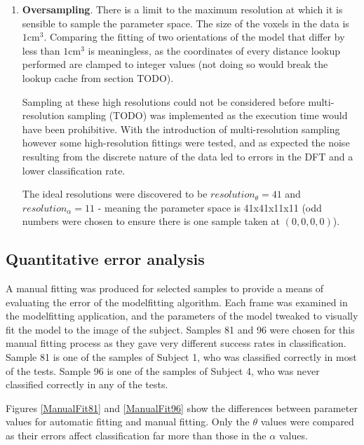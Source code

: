 \begin{enumerate}
	\item \textbf{Oversampling}.
		There is a limit to the maximum resolution at which it is sensible to sample the parameter space.
		The size of the voxels in the data is $1\text{cm}^3$.
		Comparing the fitting of two orientations of the model that differ by less than $1\text{cm}^3$ is meaningless,
		as the coordinates of every distance lookup performed are clamped to integer values (not doing so would break
		the lookup cache from section TODO).
		
		Sampling at these high resolutions could not be considered before multi-resolution sampling (TODO) was implemented
		as the execution time would have been prohibitive.
		With the introduction of multi-resolution sampling however some high-resolution fittings were tested, and as expected
		the noise resulting from the discrete nature of the data led to errors in the DFT and a lower classification rate.
		
		The ideal resolutions were discovered to be $resolution_\theta = 41$ and $resolution_\alpha = 11$ - meaning the
		parameter space is 41x41x11x11 (odd numbers were chosen to ensure there is one sample taken at $(0, 0, 0, 0)$).
\end{enumerate}


\subsection{Quantitative error analysis}

A manual fitting was produced for selected samples to provide a means of evaluating the error of the modelfitting algorithm.
Each frame was examined in the modelfitting application, and the parameters of the model tweaked to visually fit the model to the image of the subject.
Samples 81 and 96 were chosen for this manual fitting process as they gave very different success rates in classification.
Sample 81 is one of the samples of Subject 1, who was classified correctly in most of the tests.
Sample 96 is one of the samples of Subject 4, who was never classified correctly in any of the tests.

Figures \ref{ManualFit81} and \ref{ManualFit96} show the differences between parameter values for automatic fitting and manual fitting.
Only the $\theta$ values were compared as their errors affect classification far more than those in the $\alpha$ values.

